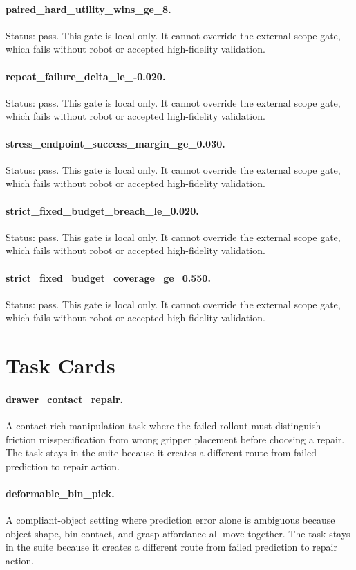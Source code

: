\documentclass{article}
\begin{document}
\paragraph{paired\_hard\_utility\_wins\_ge\_8.} Status: pass. This gate is local only. It cannot override the external scope gate, which fails without robot or accepted high-fidelity validation.
\paragraph{repeat\_failure\_delta\_le\_-0.020.} Status: pass. This gate is local only. It cannot override the external scope gate, which fails without robot or accepted high-fidelity validation.
\paragraph{stress\_endpoint\_success\_margin\_ge\_0.030.} Status: pass. This gate is local only. It cannot override the external scope gate, which fails without robot or accepted high-fidelity validation.
\paragraph{strict\_fixed\_budget\_breach\_le\_0.020.} Status: pass. This gate is local only. It cannot override the external scope gate, which fails without robot or accepted high-fidelity validation.
\paragraph{strict\_fixed\_budget\_coverage\_ge\_0.550.} Status: pass. This gate is local only. It cannot override the external scope gate, which fails without robot or accepted high-fidelity validation.
\clearpage
\section{Task Cards}
\paragraph{drawer\_contact\_repair.} A contact-rich manipulation task where the failed rollout must distinguish friction misspecification from wrong gripper placement before choosing a repair. The task stays in the suite because it creates a different route from failed prediction to repair action.
\paragraph{deformable\_bin\_pick.} A compliant-object setting where prediction error alone is ambiguous because object shape, bin contact, and grasp affordance all move together. The task stays in the suite because it creates a different route from failed prediction to repair action.
\end{document}
